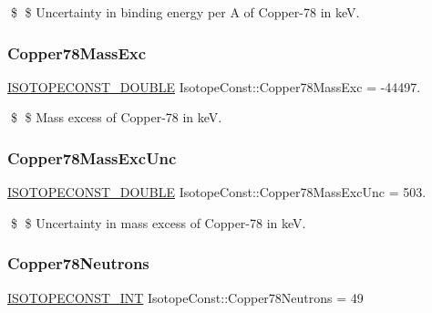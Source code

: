 \$ \$ Uncertainty in binding energy per A of Copper-\/78 in keV. \mbox{\label{group___isotope_const-_copper-_cu78_gaac5fdadc0783a2ff77b1e011ad9859f8}} 
\subsubsection{\texorpdfstring{Copper78\+Mass\+Exc}{Copper78MassExc}}
{\footnotesize\ttfamily \mbox{\hyperlink{group___isotope_const-_macros_ga8f45a7272ce02c0b4c65c44636ed719a}{I\+S\+O\+T\+O\+P\+E\+C\+O\+N\+S\+T\+\_\+\+D\+O\+U\+B\+LE}} Isotope\+Const\+::\+Copper78\+Mass\+Exc = -\/44497.}

\$ \$ Mass excess of Copper-\/78 in keV. \mbox{\label{group___isotope_const-_copper-_cu78_ga355d7ff4ebd7f38fbf381c8be361434b}} 
\subsubsection{\texorpdfstring{Copper78\+Mass\+Exc\+Unc}{Copper78MassExcUnc}}
{\footnotesize\ttfamily \mbox{\hyperlink{group___isotope_const-_macros_ga8f45a7272ce02c0b4c65c44636ed719a}{I\+S\+O\+T\+O\+P\+E\+C\+O\+N\+S\+T\+\_\+\+D\+O\+U\+B\+LE}} Isotope\+Const\+::\+Copper78\+Mass\+Exc\+Unc = 503.}

\$ \$ Uncertainty in mass excess of Copper-\/78 in keV. \mbox{\label{group___isotope_const-_copper-_cu78_gaeb961678c6c8bb5e660470b46d5a8be7}} 
\subsubsection{\texorpdfstring{Copper78\+Neutrons}{Copper78Neutrons}}
{\footnotesize\ttfamily \mbox{\hyperlink{group___isotope_const-_macros_ga5f18360b3e99483a35c32d789e62621c}{I\+S\+O\+T\+O\+P\+E\+C\+O\+N\+S\+T\+\_\+\+I\+NT}} Isotope\+Const\+::\+Copper78\+Neutrons = 49}

